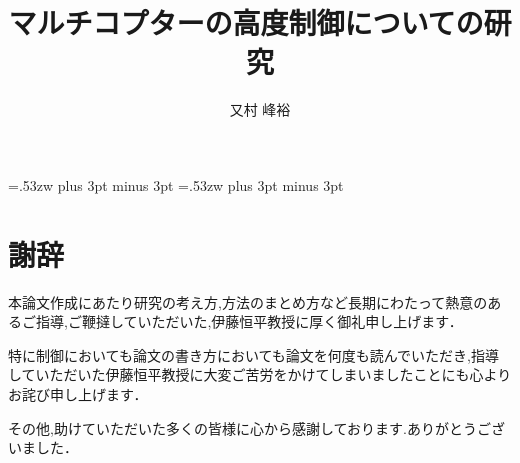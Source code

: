 \documentclass[12pt,oneside]{paper}
\title{マルチコプターの高度制御についての研究}
\author{又村 峰裕}
\begin{document}
\setlength{\baselineskip}{9truemm}

\kanjiskip=.53zw plus 3pt minus 3pt
\xkanjiskip=.53zw plus 3pt minus 3pt

\tableofcontents









%

%

%

%







\chapter*{謝辞}
本論文作成にあたり研究の考え方,方法のまとめ方など長期にわたって熱意のあるご指導,ご鞭撻していただいた,伊藤恒平教授に厚く御礼申し上げます．

特に制御においても論文の書き方においても論文を何度も読んでいただき,指導していただいた伊藤恒平教授に大変ご苦労をかけてしまいましたことにも心よりお詫び申し上げます．

その他,助けていただいた多くの皆様に心から感謝しております.ありがとうございました．

\appendix

\end{document}
